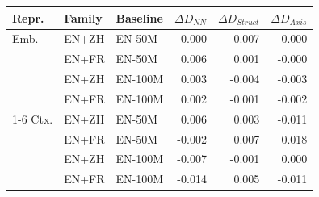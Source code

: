 \begin{tabular}{@{}lllrrr@{}}
\toprule
Repr. & Family & Baseline & $\Delta D_{NN}$ & $\Delta D_{Struct}$ & $\Delta D_{Axis}$ \\
\midrule
Emb. & EN+ZH & EN-50M & 0.000 & -0.007 & 0.000 \\
 & EN+FR & EN-50M & 0.006 & 0.001 & -0.000 \\
 & EN+ZH & EN-100M & 0.003 & -0.004 & -0.003 \\
 & EN+FR & EN-100M & 0.002 & -0.001 & -0.002 \\
\cmidrule(lr){1-6}
Ctx. & EN+ZH & EN-50M & 0.006 & 0.003 & -0.011 \\
 & EN+FR & EN-50M & -0.002 & 0.007 & 0.018 \\
 & EN+ZH & EN-100M & -0.007 & -0.001 & 0.000 \\
 & EN+FR & EN-100M & -0.014 & 0.005 & -0.011 \\
\bottomrule
\end{tabular}
